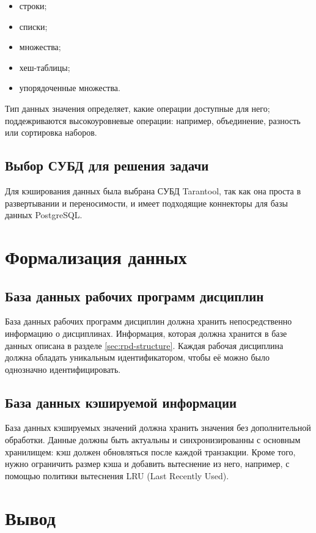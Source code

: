 \begin{itemize}
	\item строки;
	\item списки;
	\item множества;
	\item хеш-таблицы;
	\item упорядоченные множества.
\end{itemize}

Тип данных значения определяет, какие операции доступные для него; поддежриваются высокоуровневые операции: например, объединение, разность или сортировка наборов.

\subsection{Выбор СУБД для решения задачи}

Для кэширования данных была выбрана СУБД Tarantool, так как она проста в развертывании и переносимости, и имеет подходящие коннекторы для базы данных PostgreSQL.

\section{Формализация данных}

\subsection{База данных рабочих программ дисциплин}

База данных рабочих программ дисциплин должна хранить непосредственно информацию о дисциплинах. Информация, которая должна хранится в базе данных описана в разделе \ref{sec:rpd-structure}. Каждая рабочая дисциплина должна обладать уникальным идентификатором, чтобы её можно было однозначно идентифицировать.

\subsection{База данных кэшируемой информации}

База данных кэшируемых значений должна хранить значения без дополнительной обработки. Данные должны быть актуальны и синхронизированны с основным хранилищем: кэш должен обновляться после каждой транзакции. Кроме того, нужно ограничить размер кэша и добавить вытеснение из него, например, с помощью политики вытеснения LRU \cite{lru} (Last Recently Used).

\section*{Вывод}

